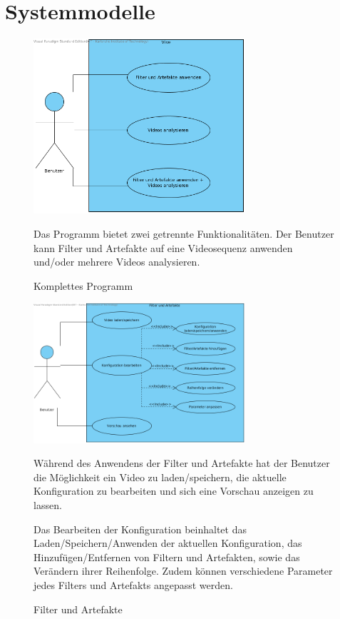 \documentclass[parskip=full]{scrartcl}
\begin{document}
\section{Systemmodelle}
\begin{figure}[htbp]
{\centering 
\includegraphics[width=0.7\textwidth]{UsecaseDiagrams/UseCaseDiagram1.png}
\caption{Komplettes Programm} }
\bigskip
Das Programm bietet zwei getrennte Funktionalitäten. Der Benutzer kann Filter und Artefakte auf eine Videosequenz anwenden und/oder mehrere Videos analysieren.

\end{figure}
\begin{figure}[htbp]
{\centering
\includegraphics[width=0.7\textwidth]{UsecaseDiagrams/FilterundArtefakteanwenden.png}
\caption{Filter und Artefakte} }
\bigskip

Während des Anwendens der Filter und Artefakte hat der Benutzer die Möglichkeit ein Video zu laden/speichern, die aktuelle Konfiguration zu bearbeiten und sich eine Vorschau anzeigen zu lassen. 

Das Bearbeiten der Konfiguration beinhaltet das Laden/Speichern/Anwenden der aktuellen Konfiguration, das Hinzufügen/Entfernen von Filtern und Artefakten, sowie das Verändern ihrer Reihenfolge. Zudem können verschiedene Parameter jedes Filters und Artefakts angepasst werden.

\end{figure}
\end{document}
